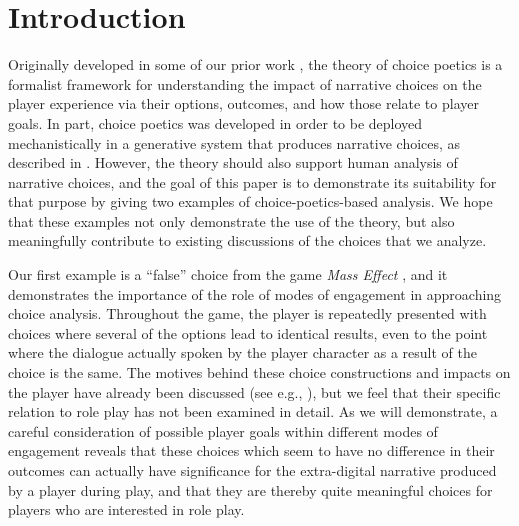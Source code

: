 \documentclass[arts,article,submit,moreauthors,pdftex,10pt,a4paper]{Definitions/mdpi}
\begin{document}
\maketitle

\section{Introduction}

Originally developed in some of our prior work \citep{mawhorter2014towards,mawhorter2015intentionally,mawhorter2015generating,mawhorter2016artificial}, the theory of choice poetics is a formalist framework for understanding the impact of narrative choices on the player experience via their options, outcomes, and how those relate to player goals.
%
In part, choice poetics was developed in order to be deployed mechanistically in a generative system that produces narrative choices, as described in \citep{mawhorter2015generating,mawhorter2016artificial}.
%
However, the theory should also support human analysis of narrative choices, and the goal of this paper is to demonstrate its suitability for that purpose by giving two examples of choice-poetics-based analysis.
%
We hope that these examples not only demonstrate the use of the theory, but also meaningfully contribute to existing discussions of the choices that we analyze.


Our first example is a ``false'' choice from the game \emph{Mass Effect} \citep{bioware2007mass}, and it demonstrates the importance of the role of modes of engagement in approaching choice analysis.
%
Throughout the game, the player is repeatedly presented with choices where several of the options lead to identical results, even to the point where the dialogue actually spoken by the player character as a result of the choice is the same.
%
The motives behind these choice constructions and impacts on the player have already been discussed (see e.g., \cite{jorgensen2010game,bizzocchi2012mass,boyan2015massively}), but we feel that their specific relation to role play has not been examined in detail.
%
As we will demonstrate, a careful consideration of possible player goals within different modes of engagement reveals that these choices which seem to have no difference in their outcomes can actually have significance for the extra-digital narrative produced by a player during play, and that they are thereby quite meaningful choices for players who are interested in role play.
\end{document}
